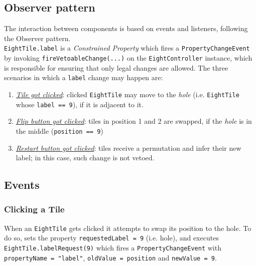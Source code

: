 \subsection{Observer pattern}

The interaction between components is based on events and listeners, following the Observer pattern.\\
\lstinline|EightTile.label| is a \textit{Constrained Property} which fires a \lstinline|PropertyChangeEvent| by invoking \lstinline|fireVetoableChange(...)| on the \lstinline|EightController| instance, which is responsible for ensuring that only legal changes are allowed.
The three scenarios in which a \lstinline|label| change may happen are:
\begin{enumerate}
   \item \textit{\ul{Tile got clicked}}: clicked \lstinline|EightTile| may move to the \textit{hole} (i.e. \lstinline|EightTile| whose \lstinline|label == 9|), if it is adjacent to it.
   \item \textit{\ul{Flip button got clicked}}: tiles in position 1 and 2 are swapped, if the \textit{hole} is in the middle (\lstinline|position == 9|) 
   \item \textit{\ul{Restart button got clicked}}: tiles receive a permutation and infer their new label; in this case, such change is not vetoed.
\end{enumerate} 

\subsection{Events}
\subsubsection{Clicking a Tile}
When an \lstinline|EightTile| gets clicked it attempts to swap its position to the hole. To do so, sets the property \lstinline|requestedLabel = 9| (i.e. hole), and executes \lstinline|EightTile.labelRequest(9)| which fires a \lstinline|PropertyChangeEvent| with \lstinline|propertyName = "label"|, \lstinline|oldValue = position| and \lstinline|newValue = 9|.

